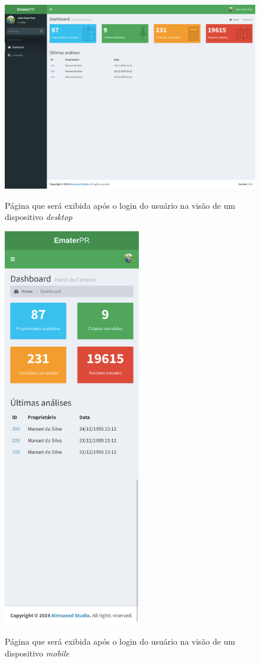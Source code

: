 \begin{figure}[H]
    \centering
    \caption{Página que será exibida após o login do usuário na visão de um dispositivo \textit{desktop}}
    \includegraphics[width=13cm]{./dados/figuras/prototipos/home_desktop.png}
    \label{fig:prototipo_home_desk}
\end{figure}

\begin{figure}[H]
    \centering
    \caption{Página que será exibida após o login do usuário na visão de um dispositivo \textit{mobile}}
    \includegraphics[width=6cm]{./dados/figuras/prototipos/home_mobile.png}
    \label{fig:prototipo_home_mobile}
\end{figure}

